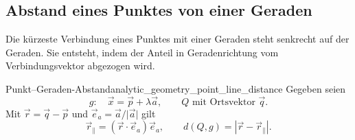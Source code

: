 \subsection{Abstand eines Punktes von einer Geraden}
\label{subsec:analytic_geometry_point_to_line_distance}

Die kürzeste Verbindung eines Punktes mit einer Geraden steht senkrecht auf
der Geraden. Sie entsteht, indem der Anteil in Geradenrichtung vom
Verbindungsvektor abgezogen wird.

\begin{center}
\end{center}

\begin{TheoremBox}{Punkt--Geraden-Abstand}{analytic_geometry_point_line_distance}
  Gegeben seien
  \[
    g:\quad\vec x=\vec p+\lambda\vec a,
    \qquad Q\text{ mit Ortsvektor }\vec q.
  \]
  Mit $\vec r=\vec q-\vec p$ und
  $\vec e_a=\vec a/\lvert\vec a\rvert$ gilt
  \[
    \vec r_{\parallel}=(\vec r\cdot\vec e_a)\vec e_a,
    \qquad
    d(Q,g)=\left\lvert\vec r-\vec r_{\parallel}\right\rvert.
  \]
\end{TheoremBox}

